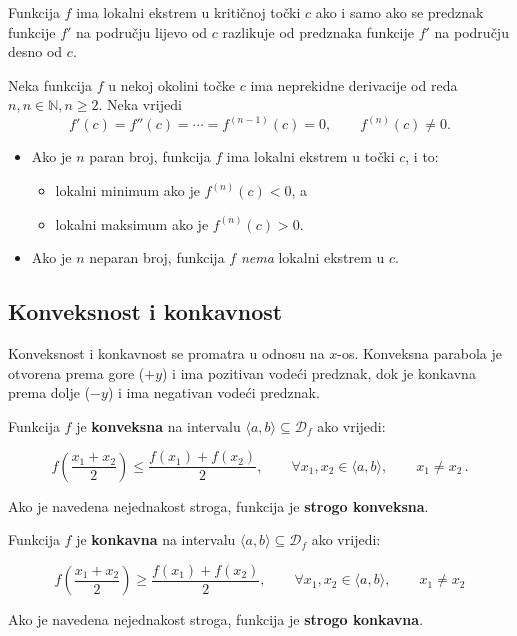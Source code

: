 Funkcija $f$ ima lokalni ekstrem u kritičnoj točki $c$ ako i samo ako se
predznak funkcije $f'$ na području lijevo od $c$ razlikuje od predznaka funkcije
$f'$ na području desno od $c$.

\begin{theorem}
    Neka funkcija $f$ u nekoj okolini točke $c$ ima neprekidne derivacije od
    reda $n, n\in\mathbb{N},n\geq 2$.
    Neka vrijedi
    $$
    f'(c)=f''(c)=\cdots=f^{(n-1)}(c)=0,\qquad f^{(n)}(c)\neq 0.
    $$

    \begin{itemize}
        \item Ako je $n$ paran broj, funkcija $f$ ima lokalni ekstrem u točki $c$, i to:
        \begin{itemize}
            \item lokalni minimum ako je $f^{(n)}(c)<0$, a
            \item lokalni maksimum ako je $f^{(n)}(c)>0$.
        \end{itemize}
        \item Ako je $n$ neparan broj, funkcija $f$ \textit{nema} lokalni
        ekstrem u $c$.
    \end{itemize}
\end{theorem}

\subsection{Konveksnost i konkavnost}

Konveksnost i konkavnost se promatra u odnosu na $x$-os. Konveksna parabola je
otvorena prema gore ($+y$) i ima pozitivan vodeći predznak, dok je konkavna
prema dolje ($-y$) i ima negativan vodeći predznak.

Funkcija $f$ je \textbf{konveksna} na intervalu $\langle a,b \rangle\subseteq\mathcal{D}_f$
ako vrijedi:

$$
f\left(\frac{x_1+x_2}{2}\right) \leq \frac{f(x_1)+f(x_2)}{2},\qquad\forall x_1,x_2 \in \langle a,b \rangle,\qquad x_1\neq x_2\,.
$$


Ako je navedena nejednakost stroga, funkcija je \textbf{strogo konveksna}.


Funkcija $f$ je \textbf{konkavna} na intervalu $\langle a,b \rangle\subseteq\mathcal{D}_f$
ako vrijedi:

$$
f\left(\frac{x_1+x_2}{2}\right) \geq \frac{f(x_1)+f(x_2)}{2},\qquad\forall x_1,x_2 \in \langle a,b \rangle,\qquad x_1\neq x_2
$$

Ako je navedena nejednakost stroga, funkcija je \textbf{strogo konkavna}.

